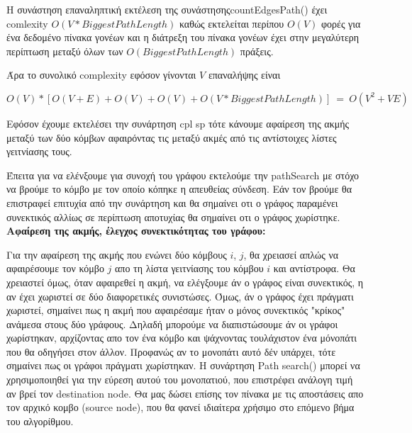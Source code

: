 \documentclass{article}
\begin{document}
Η συνάστηση επαναληπτική εκτέλεση της συνάστησηςcountEdgesPath() έχει comlexity
$O(V*Biggest Path Length)$ καθώς εκτελείται περίπου $Ο(V)$ φορές για ένα δεδομένο πίνακα γονέων και η διάτρεξη του πίνακα γονέων έχει στην μεγαλύτερη περίπτωση μεταξύ όλων των $Ο(Biggest Path Length)$ πράξεις.\bigbreak

Άρα το συνολικό complexity εφόσον γίνονται $V$ επαναλήψης είναι 

$Ο(V) * [O(V+E)+O(V)+O(V)+Ο(V*Biggest Path Length)] \ = \ O(V^2 + VE)$\bigbreak

Eφόσον έχουμε εκτελέσει την συνάρτηση cpl sp τότε κάνουμε αφαίρεση της ακμής μεταξύ των δύο κόμβων αφαιρόντας τις μεταξύ ακμές από τις αντίστοιχες λίστες γειτνίασης τους.\bigbreak

Έπειτα για να ελένξουμε για συνοχή του γράφου εκτελούμε την pathSearch με στόχο να βρούμε το κόμβο με τον οποίο κόπηκε η απευθείας σύνδεση.
Εάν τον βρούμε θα επιστραφεί επιτυχία από την συνάρτηση και θα σημαίνει οτι ο γράφος παραμένει συνεκτικός αλλίως σε περίπτωση αποτυχίας θα σημαίνει οτι ο γράφος χωρίστηκε.\bigbreak
{}
\textbf{Αφαίρεση της ακμής, έλεγχος συνεκτικότητας του γράφου:}\bigbreak

Για την αφαίρεση της ακμής που ενώνει δύο κόμβους $i$, $j$, θα χρειασεί απλώς να αφαιρέσουμε τον κόμβο $j$ απο τη λίστα γειτνίασης του κόμβου $i$ και αντίστροφα.
Θα χρειαστεί όμως, όταν αφαιρεθεί η ακμή, να ελέγξουμε άν ο γράφος είναι συνεκτικός, η αν έχει χωριστεί σε δύο διαφορετικές συνιστώσες.
Όμως, άν ο γράφος έχει πράγματι χωριστεί, σημαίνει πως η ακμή που αφαιρέσαμε ήταν ο μόνος συνεκτικός "κρίκος" ανάμεσα στους δύο γράφους.
Δηλαδή μπορούμε να διαπιστώσουμε άν οι γράφοι χωρίστηκαν, αρχίζοντας απο τον ένα κόμβο και ψάχνοντας τουλάχιστον ένα μόνοπάτι που θα οδηγήσει στον άλλον.
Προφανώς αν το μονοπάτι αυτό δέν υπάρχει, τότε σημαίνει πως οι γράφοι πράγματι χωρίστηκαν.
Η συνάρτηση Path search() μπορεί να χρησιμοποιηθεί για την εύρεση αυτού του μονοπατιού, που επιστρέφει ανάλογη τιμή αν
βρεί τον destination node. Θα μας δώσει επίσης τον πίνακα με τις αποστάσεις απο τον αρχικό κομβο 
(source node), που θα φανεί ιδιαίτερα χρήσιμο στο επόμενο βήμα του αλγορίθμου.\bigbreak
\end{document}
